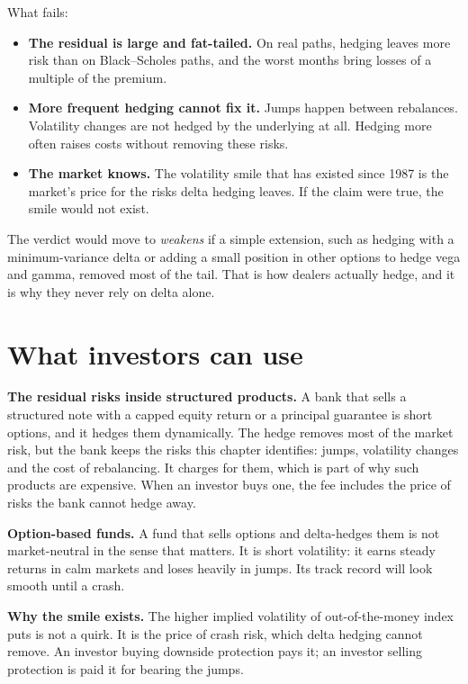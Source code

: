 What fails:

\begin{itemize}
  \item \textbf{The residual is large and fat-tailed.} On real paths, hedging leaves more risk than on Black--Scholes paths, and the worst months bring losses of a multiple of the premium.
  \item \textbf{More frequent hedging cannot fix it.} Jumps happen between rebalances. Volatility changes are not hedged by the underlying at all. Hedging more often raises costs without removing these risks.
  \item \textbf{The market knows.} The volatility smile that has existed since 1987 is the market's price for the risks delta hedging leaves. If the claim were true, the smile would not exist.
\end{itemize}

The verdict would move to \emph{weakens} if a simple extension, such as hedging with a minimum-variance delta or adding a small position in other options to hedge vega and gamma, removed most of the tail. That is how dealers actually hedge, and it is why they never rely on delta alone.

\section{What investors can use}
\label{sec:15-investors}

\textbf{The residual risks inside structured products.} A bank that sells a structured note with a capped equity return or a principal guarantee is short options, and it hedges them dynamically. The hedge removes most of the market risk, but the bank keeps the risks this chapter identifies: jumps, volatility changes and the cost of rebalancing. It charges for them, which is part of why such products are expensive. When an investor buys one, the fee includes the price of risks the bank cannot hedge away.

\textbf{Option-based funds.} A fund that sells options and delta-hedges them is not market-neutral in the sense that matters. It is short volatility: it earns steady returns in calm markets and loses heavily in jumps. Its track record will look smooth until a crash.

\textbf{Why the smile exists.} The higher implied volatility of out-of-the-money index puts is not a quirk. It is the price of crash risk, which delta hedging cannot remove. An investor buying downside protection pays it; an investor selling protection is paid it for bearing the jumps.

